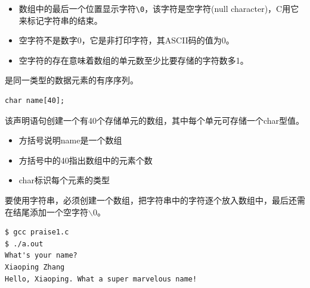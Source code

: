 \begin{frame}[fragile]\ft{\secname}
\begin{itemize}
\item 数组中的最后一个位置显示字符\lstinline|\0|，该字符是空字符(null character)，C用它来标记字符串的结束。\\[0.15in]
\item 空字符不是数字0，它是非打印字符，其ASCII码的值为0。\\[0.15in]
\item 空字符的存在意味着数组的单元数至少比要存储的字符数多1。
\end{itemize}

\end{frame}


\begin{frame}\ft{\secname}
\begin{dingyi}
是同一类型的数据元素的有序序列。
\end{dingyi}
\end{frame}


\begin{frame}[fragile]
\begin{lstlisting}
char name[40];
\end{lstlisting}
该声明语句创建一个有40个存储单元的数组，其中每个单元可存储一个char型值。
\pause \vspace{0.1in}

\begin{itemize}
\item 方括号说明name是一个数组\\[0.1in]
\item 方括号中的40指出数组中的元素个数\\[0.1in]
\item char标识每个元素的类型
\end{itemize}
\end{frame}


\begin{frame}[fragile]
要使用字符串，必须创建一个数组，把字符串中的字符逐个放入数组中，最后还需在结尾添加一个空字符$\backslash$0。
\end{frame}

\begin{frame}[fragile]

\end{frame}

\begin{frame}[fragile]

\begin{lstlisting}[backgroundcolor=\color{red!10}]
$ gcc praise1.c
$ ./a.out
What's your name?
Xiaoping Zhang
Hello, Xiaoping. What a super marvelous name!
\end{lstlisting}

\end{frame}

